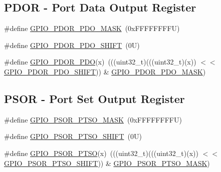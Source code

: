 \subsection*{P\+D\+OR -\/ Port Data Output Register}
\begin{DoxyCompactItemize}
\item 
\#define \mbox{\hyperlink{group___g_p_i_o___register___masks_gafd2a8274691295293b3cabfe86089801}{G\+P\+I\+O\+\_\+\+P\+D\+O\+R\+\_\+\+P\+D\+O\+\_\+\+M\+A\+SK}}~(0x\+F\+F\+F\+F\+F\+F\+F\+F\+U)
\item 
\#define \mbox{\hyperlink{group___g_p_i_o___register___masks_ga495b5f1e63de863534ce0c5f25f137ab}{G\+P\+I\+O\+\_\+\+P\+D\+O\+R\+\_\+\+P\+D\+O\+\_\+\+S\+H\+I\+FT}}~(0\+U)
\item 
\#define \mbox{\hyperlink{group___g_p_i_o___register___masks_ga4071beeff4d9b5c200686972dd52d855}{G\+P\+I\+O\+\_\+\+P\+D\+O\+R\+\_\+\+P\+DO}}(x)~(((uint32\+\_\+t)(((uint32\+\_\+t)(x)) $<$$<$ \mbox{\hyperlink{group___g_p_i_o___register___masks_ga495b5f1e63de863534ce0c5f25f137ab}{G\+P\+I\+O\+\_\+\+P\+D\+O\+R\+\_\+\+P\+D\+O\+\_\+\+S\+H\+I\+FT}})) \& \mbox{\hyperlink{group___g_p_i_o___register___masks_gafd2a8274691295293b3cabfe86089801}{G\+P\+I\+O\+\_\+\+P\+D\+O\+R\+\_\+\+P\+D\+O\+\_\+\+M\+A\+SK}})
\end{DoxyCompactItemize}
\subsection*{P\+S\+OR -\/ Port Set Output Register}
\begin{DoxyCompactItemize}
\item 
\#define \mbox{\hyperlink{group___g_p_i_o___register___masks_gaa8a48e38ef70ff1ba3bbcbf31b891da4}{G\+P\+I\+O\+\_\+\+P\+S\+O\+R\+\_\+\+P\+T\+S\+O\+\_\+\+M\+A\+SK}}~(0x\+F\+F\+F\+F\+F\+F\+F\+F\+U)
\item 
\#define \mbox{\hyperlink{group___g_p_i_o___register___masks_ga5a962b85e07477e26afe639c7ca478cb}{G\+P\+I\+O\+\_\+\+P\+S\+O\+R\+\_\+\+P\+T\+S\+O\+\_\+\+S\+H\+I\+FT}}~(0\+U)
\item 
\#define \mbox{\hyperlink{group___g_p_i_o___register___masks_ga6b16f5841a5c5f20311eafc574f814e4}{G\+P\+I\+O\+\_\+\+P\+S\+O\+R\+\_\+\+P\+T\+SO}}(x)~(((uint32\+\_\+t)(((uint32\+\_\+t)(x)) $<$$<$ \mbox{\hyperlink{group___g_p_i_o___register___masks_ga5a962b85e07477e26afe639c7ca478cb}{G\+P\+I\+O\+\_\+\+P\+S\+O\+R\+\_\+\+P\+T\+S\+O\+\_\+\+S\+H\+I\+FT}})) \& \mbox{\hyperlink{group___g_p_i_o___register___masks_gaa8a48e38ef70ff1ba3bbcbf31b891da4}{G\+P\+I\+O\+\_\+\+P\+S\+O\+R\+\_\+\+P\+T\+S\+O\+\_\+\+M\+A\+SK}})
\end{DoxyCompactItemize}
